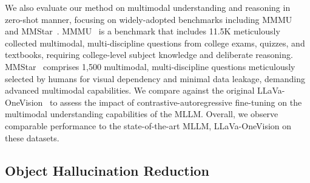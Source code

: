 We also evaluate our method on multimodal understanding and reasoning in zero-shot manner, focusing on widely-adopted benchmarks including 
MMMU~\citep{yue2024mmmu} and MMStar~\citep{chen2024we}.
MMMU~\citep{yue2024mmmu} is a benchmark that includes 11.5K meticulously collected multimodal, multi-discipline questions from college exams, quizzes, and textbooks, requiring college-level subject knowledge and deliberate reasoning. MMStar~\citep{chen2024we} comprises 1,500 multimodal, multi-discipline questions meticulously selected by humans for visual dependency and minimal data leakage, demanding advanced multimodal capabilities. 
%
We compare against the original LLaVa-OneVision~\citep{li2024llava} to assess the impact of contrastive-autoregressive fine-tuning on the multimodal understanding capabilities of the MLLM. Overall, we observe comparable performance to the state-of-the-art MLLM, LLaVa-OneVision on these datasets. 


\subsection{Object Hallucination Reduction}\label{subsec:oh_reduction}

